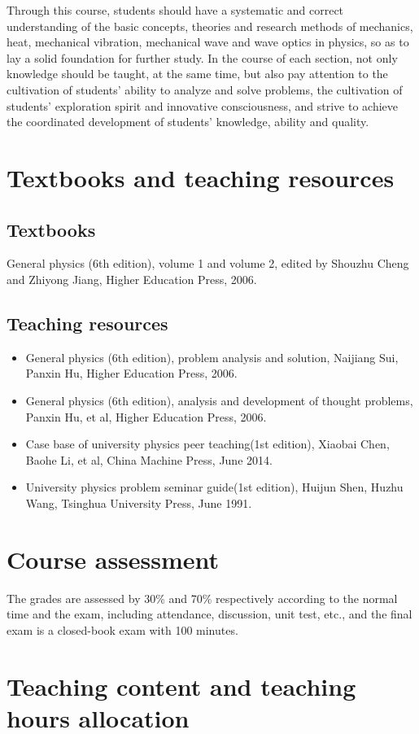 \documentclass[10pt,a4paper,oneside]{article}
\begin{document}
Through this course, students should have a systematic and correct understanding of the basic concepts, theories and research methods of mechanics, heat, mechanical vibration, mechanical wave and wave optics in physics, so as to lay a solid foundation for further study. In the course of each section, not only knowledge should be taught, at the same time, but also pay attention to the cultivation of students' ability to analyze and solve problems, the cultivation of students' exploration spirit and innovative consciousness, and strive to achieve the coordinated development of students' knowledge, ability and quality.
\section{Textbooks and teaching resources}
\subsection{Textbooks}
General physics (6th edition), volume 1 and volume 2, edited by Shouzhu Cheng and Zhiyong Jiang, Higher Education Press, 2006.
\subsection{Teaching resources}
\begin{itemize}
\item General physics (6th edition), problem analysis and solution,  Naijiang Sui, Panxin Hu, Higher Education Press, 2006.
\item General physics (6th edition), analysis and development of thought problems, Panxin Hu, et al, Higher Education Press, 2006.
\item Case base of university physics peer teaching(1st edition), Xiaobai Chen, Baohe Li, et al, China Machine Press, June 2014.
\item University physics problem seminar guide(1st edition), Huijun Shen, Huzhu Wang, Tsinghua University Press,  June 1991.
\end{itemize}
\section{Course assessment}
The grades are assessed by 30\% and 70\% respectively according to the normal time and the exam, including attendance, discussion, unit test, etc., and the final exam is a closed-book exam with 100 minutes.
\section{Teaching content and teaching hours allocation }
\end{document}
